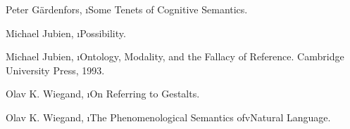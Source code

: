 \begin{thebibliography}{99}

Peter G\"ardenfors, \i{Some Tenets of Cognitive Semantics}.

Michael Jubien, \i{Possibility}.

Michael Jubien, \i{Ontology, Modality, and the
Fallacy of Reference}.  Cambridge University Press, 1993.

Olav K. Wiegand, \i{On Referring to Gestalts}.

Olav K. Wiegand, \i{The Phenomenological Semantics 
ofvNatural Language}.


\end{thebibliography}